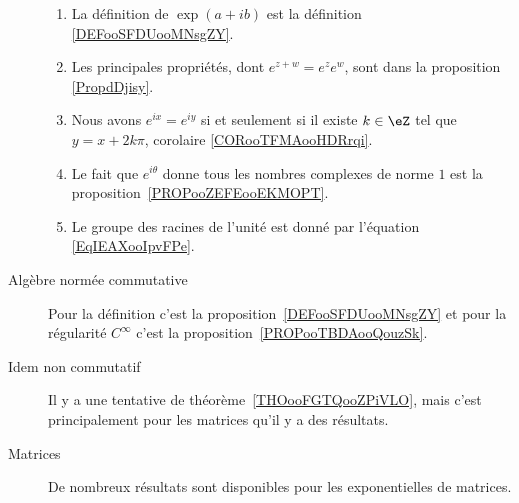 \begin{description}
		\begin{enumerate}
			\item
			      La définition de \( \exp(a+ib)\) est la définition \ref{DEFooSFDUooMNsgZY}.
			\item
			      Les principales propriétés, dont \(  e^{z+w}= e^{z} e^{w}\), sont dans la proposition \ref{PropdDjisy}.
			\item
			      Nous avons \(  e^{ix}= e^{iy}\) si et seulement si il existe \( k\in\eZ\) tel que \( y=x+2k\pi\), corolaire \ref{CORooTFMAooHDRrqi}.
			\item
			      Le fait que \(  e^{i\theta}\) donne tous les nombres complexes de norme \( 1\) est la proposition~\ref{PROPooZEFEooEKMOPT}.
			\item
			      Le groupe des racines de l'unité est donné par l'équation \eqref{EqIEAXooIpvFPe}.
		\end{enumerate}

	\item[Algèbre normée commutative]

		Pour la définition c'est la proposition~\ref{DEFooSFDUooMNsgZY} et pour la régularité \(  C^{\infty}\) c'est la proposition~\ref{PROPooTBDAooQouzSk}.

	\item[Idem non commutatif]

		Il y a une tentative de théorème~\ref{THOooFGTQooZPiVLO}, mais c'est principalement pour les matrices qu'il y a des résultats.

	\item[Matrices]

		De nombreux résultats sont disponibles pour les exponentielles de matrices.


\end{description}

